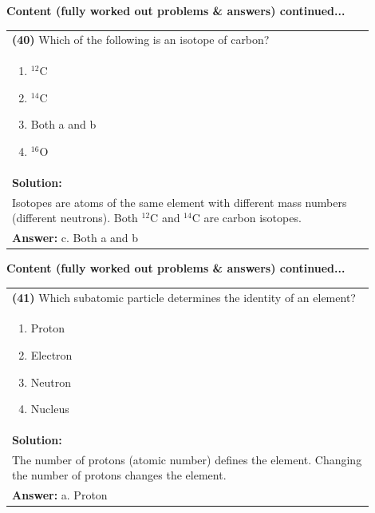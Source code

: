 \documentclass{article}
\begin{document}
{\noindent
{\large\textbf{Content (fully worked out problems \& answers) continued...}}\\[0.2em]
\vspace{0.2cm}
\begin{tabular}{|p{0.9\linewidth}|}
\hline
\vspace{0.2cm}
\textbf{(40)} Which of the following is an isotope of carbon? \\
\begin{minipage}[t]{0.85\linewidth}
\begin{enumerate}[label=\alph*.]
\item $^{12}$C \
\item $^{14}$C \
\item Both a and b \ 
\item $^{16}$O 
\end{enumerate}
\end{minipage}\\
\hline
\vspace{0.2cm}
\textbf{Solution:} \\
Isotopes are atoms of the same element with different mass numbers (different neutrons). Both $^{12}$C and $^{14}$C are carbon isotopes. \\
\hline
\vspace{0.2cm}
\textbf{Answer:} c. Both a and b \\
\hline
\end{tabular}
\newpage

\noindent
{\large\textbf{Content (fully worked out problems \& answers) continued...}}\\[0.2em]
\vspace{0.2cm}
\begin{tabular}{|p{0.9\linewidth}|}
\hline
\vspace{0.2cm}
\textbf{(41)} Which subatomic particle determines the identity of an element? \\
\begin{minipage}[t]{0.85\linewidth}
\begin{enumerate}[label=\alph*.]
\item Proton \
\item Electron \
\item Neutron \
\item Nucleus \
\end{enumerate}
\end{minipage}\\
\hline
\vspace{0.2cm}
\textbf{Solution:} \\
The number of protons (atomic number) defines the element. Changing the number of protons changes the element. \\
\hline
\vspace{0.2cm}
\textbf{Answer:} a. Proton \\
\hline
\end{tabular}
\newpage

}
\end{document}
